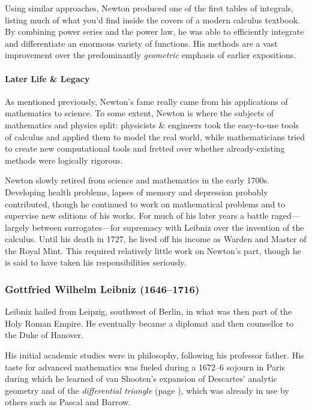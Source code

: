 Using similar approaches, Newton produced one of the first tables of integrals, listing much of what you'd find inside the covers of a modern calculus textbook. By combining power series and the power law, he was able to efficiently integrate and differentiate an enormous variety of functions. His methods are a vast improvement over the predominantly \emph{geometric} emphasis of earlier expositions.


\paragraph{Later Life \& Legacy}

As mentioned previously, Newton's fame really came from his applications of mathematics to science. To some extent, Newton is where the subjects of mathematics and physics split: physicists \& engineers took the easy-to-use tools of calculus and applied them to model the real world, while mathematicians tried to create new computational tools and fretted over whether already-existing methods were logically rigorous.
\smallbreak

Newton slowly retired from science and mathematics in the early 1700s. Developing health problems, lapses of memory and depression probably contributed, though he continued to work on mathematical problems and to supervise new editions of his works. For much of his later years a battle raged---largely between surrogates---for supremacy with Leibniz over the invention of the calculus. Until his death in 1727, he lived off his income as Warden and Master of the Royal Mint. This required relatively little work on Newton's part, though he is said to have taken his responsibilities seriously.



\pagebreak[3]



\subsubsection*{Gottfried Wilhelm Leibniz (1646--1716)}

Leibniz hailed from Leipzig, southwest of Berlin, in what was then part of the Holy Roman Empire. He eventually became a diplomat and then counsellor to the Duke of Hanover.
\smallbreak

His initial academic studies were in philosophy, following his professor father. His taste for advanced mathematics was fueled during a 1672--6 sojourn in Paris during which he learned of van Shooten's expansion of Descartes' analytic geometry and of the \emph{differential triangle} (page \pageref{sec:calc2}), which was already in use by others such as Pascal and Barrow.


